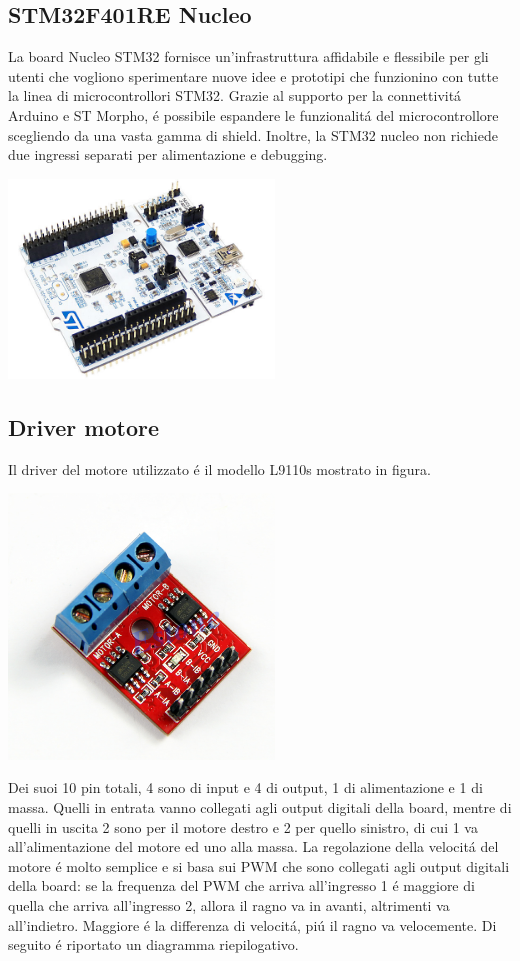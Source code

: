\documentclass [11pt ,a4paper ,twoside ]{article}
\begin{document}
\subsection{STM32F401RE Nucleo}
La board Nucleo STM32 fornisce un'infrastruttura affidabile e flessibile per gli utenti che vogliono sperimentare nuove idee e prototipi che funzionino con tutte la linea di microcontrollori STM32. Grazie al supporto per la connettivit\'a Arduino e ST Morpho, \'e possibile espandere le funzionalit\'a del microcontrollore scegliendo da una vasta gamma di shield. Inoltre, la STM32 nucleo non richiede due ingressi separati per alimentazione e debugging.
\begin{center}
\includegraphics[keepaspectratio, width=200pt]{Images/STM32.png}
\end{center}
\subsection{Driver motore}
Il driver del motore utilizzato \'e il modello L9110s mostrato in figura. 
\begin{center}
\includegraphics[keepaspectratio, width=200pt]{Images/motor_driver.png}
\end{center}
Dei suoi 10 pin totali, 4 sono di input e 4 di output, 1 di alimentazione e 1 di massa. Quelli in entrata vanno collegati agli output digitali della board, mentre di quelli in uscita 2 sono per il motore destro e 2 per quello sinistro, di cui 1 va all'alimentazione del motore ed uno alla massa. La regolazione della velocit\'a del motore \'e molto semplice e si basa sui PWM che sono collegati agli output digitali della board: se la frequenza del PWM  che arriva all'ingresso 1 \'e maggiore di quella che arriva all'ingresso 2, allora il ragno va in avanti, altrimenti va all'indietro. Maggiore \'e la differenza di velocit\'a, pi\'u il ragno va velocemente. Di seguito \'e riportato un diagramma riepilogativo.
\end{document}
